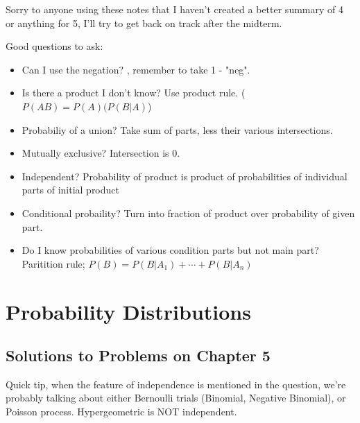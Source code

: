 \documentclass[english, 11pt]{article}
\begin{document}
  \begin{note}
    Sorry to anyone using these notes that I haven't created a better summary of 4 or anything for 5, I'll try to get back on track after the midterm.
  \end{note}

  \begin{note}
    Good questions to ask:
    \begin{itemize}
      \item Can I use the negation? , remember to take 1 - "neg".
      \item Is there a product I don't know? Use product rule. ($P(AB) = P(A)(P(B|A)$)
      \item Probabiliy of a union? Take sum of parts, less their various intersections.
      \item Mutually exclusive? Intersection is 0.
      \item Independent? Probability of product is product of probabilities of individual parts of initial product
      \item Conditional probaility? Turn into fraction of product over probability of given part.
      \item Do I know probabilities of various condition parts but not main part? Paritition rule; $P(B) = P(B|A_1) + \cdots + P(B|A_n)$
    \end{itemize}
  \end{note}

  \section{Probability Distributions}
  \subsection{Solutions to Problems on Chapter 5}

  Quick tip, when the feature of independence is mentioned in the question, we're probably talking about either Bernoulli trials (Binomial, Negative Binomial), or Poisson process. Hypergeometric is NOT independent.
\end{document}
